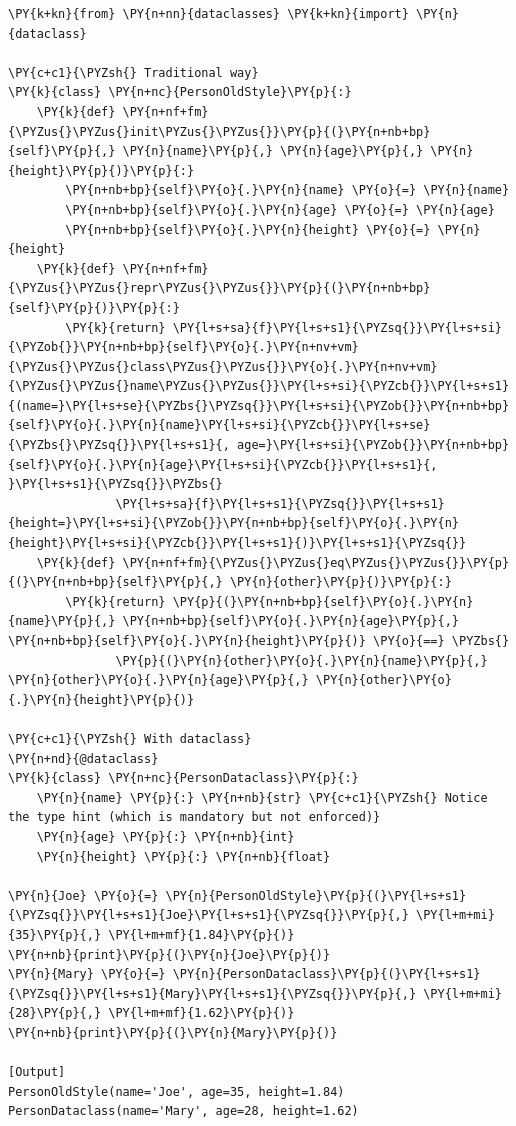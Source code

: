 \begin{Verbatim}[label=\makebox{\url{https://github.com/lucabaldini/cmepda/tree/master/slides/latex/snippets/dataclass.py}},commandchars=\\\{\}]
\PY{k+kn}{from} \PY{n+nn}{dataclasses} \PY{k+kn}{import} \PY{n}{dataclass}

\PY{c+c1}{\PYZsh{} Traditional way}
\PY{k}{class} \PY{n+nc}{PersonOldStyle}\PY{p}{:}
    \PY{k}{def} \PY{n+nf+fm}{\PYZus{}\PYZus{}init\PYZus{}\PYZus{}}\PY{p}{(}\PY{n+nb+bp}{self}\PY{p}{,} \PY{n}{name}\PY{p}{,} \PY{n}{age}\PY{p}{,} \PY{n}{height}\PY{p}{)}\PY{p}{:}
        \PY{n+nb+bp}{self}\PY{o}{.}\PY{n}{name} \PY{o}{=} \PY{n}{name}
        \PY{n+nb+bp}{self}\PY{o}{.}\PY{n}{age} \PY{o}{=} \PY{n}{age}
        \PY{n+nb+bp}{self}\PY{o}{.}\PY{n}{height} \PY{o}{=} \PY{n}{height}
    \PY{k}{def} \PY{n+nf+fm}{\PYZus{}\PYZus{}repr\PYZus{}\PYZus{}}\PY{p}{(}\PY{n+nb+bp}{self}\PY{p}{)}\PY{p}{:}
        \PY{k}{return} \PY{l+s+sa}{f}\PY{l+s+s1}{\PYZsq{}}\PY{l+s+si}{\PYZob{}}\PY{n+nb+bp}{self}\PY{o}{.}\PY{n+nv+vm}{\PYZus{}\PYZus{}class\PYZus{}\PYZus{}}\PY{o}{.}\PY{n+nv+vm}{\PYZus{}\PYZus{}name\PYZus{}\PYZus{}}\PY{l+s+si}{\PYZcb{}}\PY{l+s+s1}{(name=}\PY{l+s+se}{\PYZbs{}\PYZsq{}}\PY{l+s+si}{\PYZob{}}\PY{n+nb+bp}{self}\PY{o}{.}\PY{n}{name}\PY{l+s+si}{\PYZcb{}}\PY{l+s+se}{\PYZbs{}\PYZsq{}}\PY{l+s+s1}{, age=}\PY{l+s+si}{\PYZob{}}\PY{n+nb+bp}{self}\PY{o}{.}\PY{n}{age}\PY{l+s+si}{\PYZcb{}}\PY{l+s+s1}{, }\PY{l+s+s1}{\PYZsq{}}\PYZbs{}
               \PY{l+s+sa}{f}\PY{l+s+s1}{\PYZsq{}}\PY{l+s+s1}{height=}\PY{l+s+si}{\PYZob{}}\PY{n+nb+bp}{self}\PY{o}{.}\PY{n}{height}\PY{l+s+si}{\PYZcb{}}\PY{l+s+s1}{)}\PY{l+s+s1}{\PYZsq{}}
    \PY{k}{def} \PY{n+nf+fm}{\PYZus{}\PYZus{}eq\PYZus{}\PYZus{}}\PY{p}{(}\PY{n+nb+bp}{self}\PY{p}{,} \PY{n}{other}\PY{p}{)}\PY{p}{:}
        \PY{k}{return} \PY{p}{(}\PY{n+nb+bp}{self}\PY{o}{.}\PY{n}{name}\PY{p}{,} \PY{n+nb+bp}{self}\PY{o}{.}\PY{n}{age}\PY{p}{,} \PY{n+nb+bp}{self}\PY{o}{.}\PY{n}{height}\PY{p}{)} \PY{o}{==} \PYZbs{}
               \PY{p}{(}\PY{n}{other}\PY{o}{.}\PY{n}{name}\PY{p}{,} \PY{n}{other}\PY{o}{.}\PY{n}{age}\PY{p}{,} \PY{n}{other}\PY{o}{.}\PY{n}{height}\PY{p}{)} 

\PY{c+c1}{\PYZsh{} With dataclass}
\PY{n+nd}{@dataclass}
\PY{k}{class} \PY{n+nc}{PersonDataclass}\PY{p}{:}
    \PY{n}{name} \PY{p}{:} \PY{n+nb}{str} \PY{c+c1}{\PYZsh{} Notice the type hint (which is mandatory but not enforced)}
    \PY{n}{age} \PY{p}{:} \PY{n+nb}{int}
    \PY{n}{height} \PY{p}{:} \PY{n+nb}{float}

\PY{n}{Joe} \PY{o}{=} \PY{n}{PersonOldStyle}\PY{p}{(}\PY{l+s+s1}{\PYZsq{}}\PY{l+s+s1}{Joe}\PY{l+s+s1}{\PYZsq{}}\PY{p}{,} \PY{l+m+mi}{35}\PY{p}{,} \PY{l+m+mf}{1.84}\PY{p}{)}
\PY{n+nb}{print}\PY{p}{(}\PY{n}{Joe}\PY{p}{)}
\PY{n}{Mary} \PY{o}{=} \PY{n}{PersonDataclass}\PY{p}{(}\PY{l+s+s1}{\PYZsq{}}\PY{l+s+s1}{Mary}\PY{l+s+s1}{\PYZsq{}}\PY{p}{,} \PY{l+m+mi}{28}\PY{p}{,} \PY{l+m+mf}{1.62}\PY{p}{)}
\PY{n+nb}{print}\PY{p}{(}\PY{n}{Mary}\PY{p}{)}

[Output]
PersonOldStyle(name='Joe', age=35, height=1.84)
PersonDataclass(name='Mary', age=28, height=1.62)
\end{Verbatim}